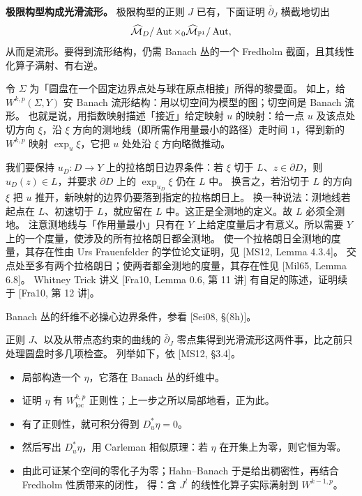 \textbf{极限构型构成光滑流形。}
极限构型的正则 $J$ 已有，下面证明 $\bar\partial_J$ 横截地切出
\[
\widehat{\mathcal{M}}_D/\operatorname{Aut}\times_0\widehat{\mathcal{M}}_{\mathbb{P}^1}/\operatorname{Aut},
\]
从而是流形。要得到流形结构，仍需 Banach 丛的一个 Fredholm 截面，且其线性化算子满射、有右逆。


令 $\Sigma$ 为「圆盘在一个固定边界点处与球在原点相接」所得的黎曼面。
如上，给 $W^{k,p}(\Sigma,Y)$ 安 Banach 流形结构：用以切空间为模型的图；切空间是 Banach 流形。
也就是说，用指数映射描述「接近」给定映射 $u$ 的映射：给一点 $u$ 及该点处切方向 $\xi$，沿 $\xi$ 方向的测地线（即所需作用量最小的路径）走时间 $1$，得到新的 $W^{k,p}$ 映射 $\exp_u\xi$，它把 $u$ 处处沿 $\xi$ 方向略微推动。

我们要保持 $u_D\colon D\to Y$ 上的拉格朗日边界条件：若 $\xi$ 切于 $L$、$z\in\partial D$，则 $u_D(z)\in L$，并要求 $\partial D$ 上的 $\exp_{u_D}\xi$ 仍在 $L$ 中。
换言之，若沿切于 $L$ 的方向 $\xi$ 把 $u$ 推开，新映射的边界仍要落到指定的拉格朗日上。
换一种说法：测地线若起点在 $L$、初速切于 $L$，就应留在 $L$ 中。这正是全测地的定义。故 $L$ 必须全测地。
注意测地线与「作用量最小」只有在 $Y$ 上给定度量后才有意义。所以需要 $Y$ 上的一个度量，使涉及的所有拉格朗日都全测地。
使一个拉格朗日全测地的度量，其存在性由 Urs Frauenfelder 的学位论文证明，见 [MS12, Lemma 4.3.4]。
交点处至多有两个拉格朗日；使两者都全测地的度量，其存在性见 [Mil65, Lemma 6.8]。
Whitney Trick 讲义 [Fra10, Lemma 0.6, 第 11 讲] 有自足的陈述，证明续于 [Fra10, 第 12 讲]。

Banach 丛的纤维不必操心边界条件，参看 [Sei08, §(8h)]。

正则 $J$、以及从带点态约束的曲线的 $\bar\partial_J$ 零点集得到光滑流形这两件事，比之前只处理圆盘时多几项检查。
列举如下，依 [MS12, §3.4]。

\begin{itemize}[leftmargin=1.6em,itemsep=0.2em]
\item 局部构造一个 $\eta$，它落在 Banach 丛的纤维中。
\item 证明 $\eta$ 有 $W^{k,p}_{\mathrm{loc}}$ 正则性；上一步之所以局部地看，正为此。
\item 有了正则性，就可积分得到 $D^*_u\eta=0$。
\item 然后写出 $D^*_u\eta$，用 Carleman 相似原理：若 $\eta$ 在开集上为零，则它恒为零。
\item 由此可证某个空间的零化子为零；Hahn--Banach 于是给出稠密性，再结合 Fredholm 性质带来的闭性，
      得：含 $J^l$ 的线性化算子实际满射到 $W^{k-1,p}$。
\end{itemize}

